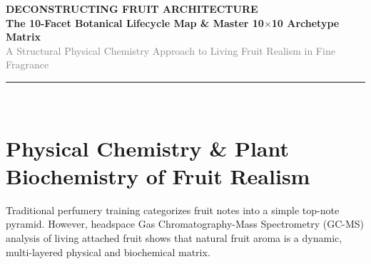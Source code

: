 \documentclass[11pt,a4paper]{article}
\begin{document}
\begin{center}
    {\huge \bfseries \textcolor{GoldDark}{DECONSTRUCTING FRUIT ARCHITECTURE}}\\[0.4em]
    {\Large \bfseries The 10-Facet Botanical Lifecycle Map \& Master \texorpdfstring{10$\times$10}{10x10} Archetype Matrix}\\[0.8em]
    {\large \textcolor{gray}{A Structural Physical Chemistry Approach to Living Fruit Realism in Fine Fragrance}}\\[1.2em]
    \rule{\textwidth}{1.2pt}\\[1.5em]
\end{center}

\begin{abstract}
Traditional fruity fragrance formulation relies on simplified, flat ester mixtures (e.g., Ethyl Butanoate, Isoamyl Acetate) that yield synthetic "candy-like" impressions. This paper establishes the \textbf{3D Anatomical Lifecycle Model}, a comprehensive structural framework mapping living fruit anatomy across 10 distinct facets---from the outer epicarp wax ($F_1$) to inner mesocarp pith ($F_2$), fleshy core pulp ($F_3$), cytoplasmic vacuole sap ($F_4$), translucent aril ($F_5$), stem latex ($F_6$), lignified seed stone ($F_7$), calyx crown ($F_8$), and post-harvest thermal transformations ($F_9, F_{10}$). Integrating physical chemistry parameters---Vapor Pressure ($\text{VP}$ in $\text{Pa}$ at 25$^\circ$C), molecular weight ($\text{MW}$), and human odor thresholds ($\text{ppb}$)---with high-impact aroma chemicals, we provide the definitive \textbf{Master \texorpdfstring{10$\times$10}{10x10} Fruit Archetype Matrix} and compounding protocols for compounding hyper-realistic living fruit accords.
\end{abstract}

\vspace{1em}

\section{Physical Chemistry \& Plant Biochemistry of Fruit Realism}

Traditional perfumery training categorizes fruit notes into a simple top-note pyramid. However, headspace Gas Chromatography-Mass Spectrometry (GC-MS) analysis of living attached fruit shows that natural fruit aroma is a dynamic, multi-layered physical and biochemical matrix.
\end{document}
